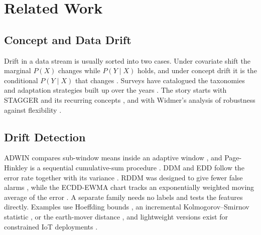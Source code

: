 \documentclass[conference]{IEEEtran}
\begin{document}
\section{Related Work}


\subsection{Concept and Data Drift}
Drift in a data stream is usually sorted into two cases. Under covariate shift the
marginal $P(X)$ changes while $P(Y\mid X)$ holds, and under concept drift it is the
conditional $P(Y\mid X)$ that changes \cite{gama2004learning,lu2018learning}. Surveys
have catalogued the taxonomies and adaptation strategies built up over the years
\cite{khamassi2018discussion}. The story starts with STAGGER and its recurring concepts
\cite{schlimmer1986incremental}, and with Widmer's analysis of robustness against
flexibility \cite{widmer1994combining}. 


\subsection{Drift Detection}


ADWIN compares sub-window means inside an adaptive window \cite{bifet2007learning},
and Page-Hinkley is a sequential cumulative-sum procedure \cite{page1954continuous}.
DDM and EDD follow the error rate together with its variance
\cite{gama2004learning,baena2006early}. RDDM was designed to give fewer false alarms
\cite{barros2017rddm}, while the ECDD-EWMA chart tracks an exponentially weighted
moving average of the error \cite{ross2012exponentially}. A separate family needs no
labels and tests the features directly. Examples use Hoeffding bounds
\cite{frias2014online}, an incremental Kolmogorov--Smirnov statistic
\cite{dos2016fast}, or the earth-mover distance \cite{brockhoff2020time}, and
lightweight versions exist for constrained IoT deployments \cite{9427288}. 
\end{document}
